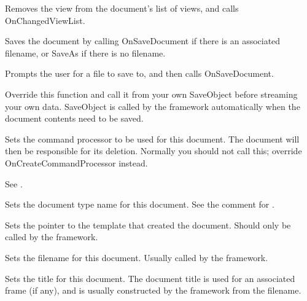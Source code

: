 

Removes the view from the document's list of views, and calls OnChangedViewList.



Saves the document by calling OnSaveDocument if there is an associated filename,
or SaveAs if there is no filename.



Prompts the user for a file to save to, and then calls OnSaveDocument.



Override this function and call it from your own SaveObject before
streaming your own data. SaveObject is called by the framework
automatically when the document contents need to be saved.



Sets the command processor to be used for this document. The document will then be responsible
for its deletion. Normally you should not call this; override OnCreateCommandProcessor
instead.

See .



Sets the document type name for this document. See the comment for .



Sets the pointer to the template that created the document. Should only be called by the
framework.



Sets the filename for this document. Usually called by the framework.



Sets the title for this document. The document title is used for an associated
frame (if any), and is usually constructed by the framework from
the filename.


